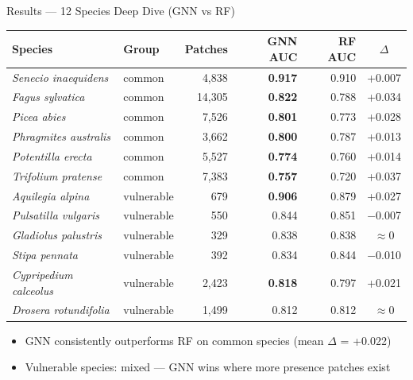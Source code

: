 \documentclass[aspectratio=169,11pt]{beamer}
\begin{document}
\begin{frame}{Results --- 12 Species Deep Dive (GNN vs RF)}

{\small
\begin{tabular}{llrrrc}
\toprule
\textbf{Species} & \textbf{Group} & \textbf{Patches} & \textbf{GNN AUC} & \textbf{RF AUC} & \textbf{$\Delta$} \\
\midrule
\textit{Senecio inaequidens}  & common     & 4,838  & \textbf{0.917} & 0.910 & +0.007 \\
\textit{Fagus sylvatica}      & common     & 14,305 & \textbf{0.822} & 0.788 & +0.034 \\
\textit{Picea abies}          & common     & 7,526  & \textbf{0.801} & 0.773 & +0.028 \\
\textit{Phragmites australis} & common     & 3,662  & \textbf{0.800} & 0.787 & +0.013 \\
\textit{Potentilla erecta}    & common     & 5,527  & \textbf{0.774} & 0.760 & +0.014 \\
\textit{Trifolium pratense}   & common     & 7,383  & \textbf{0.757} & 0.720 & +0.037 \\
\midrule
\textit{Aquilegia alpina}     & vulnerable & 679    & \textbf{0.906} & 0.879 & +0.027 \\
\textit{Pulsatilla vulgaris}  & vulnerable & 550    & 0.844 & 0.851 & $-$0.007 \\
\textit{Gladiolus palustris}  & vulnerable & 329    & 0.838 & 0.838 & $\approx$0 \\
\textit{Stipa pennata}        & vulnerable & 392    & 0.834 & 0.844 & $-$0.010 \\
\textit{Cypripedium calceolus}& vulnerable & 2,423  & \textbf{0.818} & 0.797 & +0.021 \\
\textit{Drosera rotundifolia} & vulnerable & 1,499  & 0.812 & 0.812 & $\approx$0 \\
\bottomrule
\end{tabular}
}

\bigskip

\begin{itemize}\setlength\itemsep{1pt}
  \item GNN consistently outperforms RF on common species (mean $\Delta$ = +0.022)
  \item Vulnerable species: mixed --- GNN wins where more presence patches exist
\end{itemize}

\end{frame}
\end{document}
